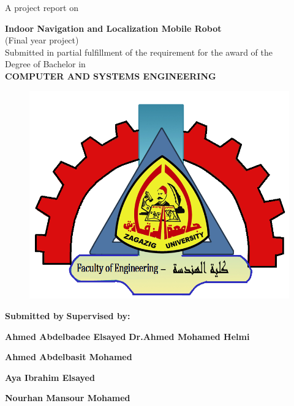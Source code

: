 \documentclass[12pt]{book}
\begin{document}
 
\begin{titlepage}
	
\thispagestyle{empty}

\begin{center}
\large {A project report on}

\Huge{\bfseries Indoor Navigation and Localization Mobile Robot }\\[0.5cm]
\large{(Final year project)}
 \\
 Submitted in partial fulfillment of the requirement for the award of the\\
 \large {Degree of Bachelor in }\\
 
 \large{\bfseries COMPUTER AND SYSTEMS ENGINEERING }\\
 
 \vspace{1.2cm}
 \begin{figure}[H]
\centering
\includegraphics[width =.45\textwidth]{Fig/faculty.png}

\end{figure}
 \vspace{.5cm}
\end{center}
 
\hspace{1cm} {\LARGE \bfseries Submitted by}  \hspace{3.5cm} {\LARGE \bfseries Supervised by:}


\hspace{0.5cm} {\bfseries  Ahmed Abdelbadee Elsayed}\hspace{2.5cm} {\bfseries  Dr.Ahmed Mohamed Helmi }

\hspace{0.5cm} {\bfseries Ahmed Abdelbasit Mohamed} 


\hspace{0.5cm} {\bfseries  Aya Ibrahim Elsayed} 


\hspace{0.5cm} {\bfseries Nourhan Mansour Mohamed} 



\end{titlepage}
\end{document}
